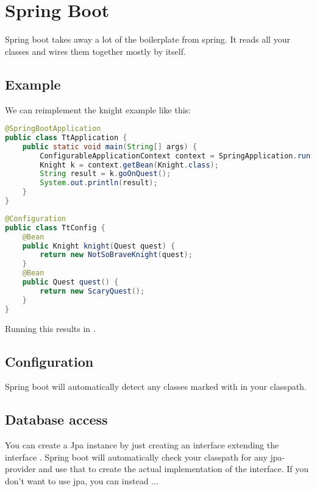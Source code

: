 \section{Spring Boot}

Spring boot takes away a lot of the boilerplate from spring. It reads all your classes and wires them together mostly by itself.


\subsection{Example}
We can reimplement the knight example like this: 

\begin{lstlisting}[language=java, title=TtAplication]
@SpringBootApplication
public class TtApplication {
	public static void main(String[] args) {
		ConfigurableApplicationContext context = SpringApplication.run(TtApplication.class, args);
		Knight k = context.getBean(Knight.class);
		String result = k.goOnQuest();
		System.out.println(result);
	}
}
\end{lstlisting}

\begin{lstlisting}[language=java, title=TtConfig]
@Configuration
public class TtConfig {
	@Bean
	public Knight knight(Quest quest) {
		return new NotSoBraveKnight(quest);
	}
	@Bean 
	public Quest quest() {
		return new ScaryQuest();
	}
}
\end{lstlisting}

Running this results in .



\subsection{Configuration}
Spring boot will automatically detect any classes marked with   in your classpath.




\subsection{Database access}

You can create a Jpa instance by just creating an interface extending the interface .  Spring boot will automatically check your classpath for any jpa-provider and use that to create the actual implementation of the interface. 
If you don't want to use jpa, you can instead ...








